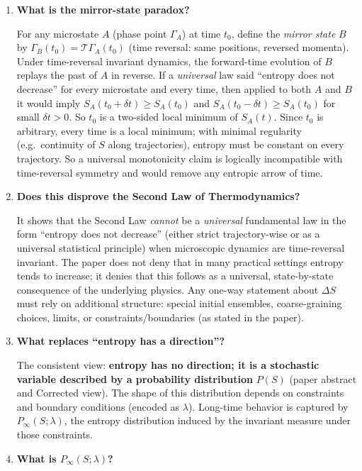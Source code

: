\documentclass[11pt,a4paper]{article}
\begin{document}
\begin{enumerate}[leftmargin=*]

\item \textbf{What is the mirror-state paradox?}

For any microstate $A$ (phase point $\Gamma_A$) at time $t_0$, define the \emph{mirror state} $B$ by $\Gamma_B(t_0)=\mathcal{T}\Gamma_A(t_0)$ (time reversal: same positions, reversed momenta). Under time-reversal invariant dynamics, the forward-time evolution of $B$ replays the past of $A$ in reverse. If a \emph{universal} law said ``entropy does not decrease'' for every microstate and every time, then applied to both $A$ and $B$ it would imply $S_A(t_0+\delta t) \ge S_A(t_0)$ and $S_A(t_0-\delta t) \ge S_A(t_0)$ for small $\delta t > 0$. So $t_0$ is a two-sided local minimum of $S_A(t)$. Since $t_0$ is arbitrary, every time is a local minimum; with minimal regularity (e.g.\ continuity of $S$ along trajectories), entropy must be constant on every trajectory. So a universal monotonicity claim is logically incompatible with time-reversal symmetry and would remove any entropic arrow of time.

\item \textbf{Does this disprove the Second Law of Thermodynamics?}

It shows that the Second Law \emph{cannot} be a \emph{universal} fundamental law in the form ``entropy does not decrease'' (either strict trajectory-wise or as a universal statistical principle) when microscopic dynamics are time-reversal invariant. The paper does not deny that in many practical settings entropy tends to increase; it denies that this follows as a universal, state-by-state consequence of the underlying physics. Any one-way statement about $\Delta S$ must rely on additional structure: special initial ensembles, coarse-graining choices, limits, or constraints/boundaries (as stated in the paper).

\item \textbf{What replaces ``entropy has a direction''?}

The consistent view: \textbf{entropy has no direction; it is a stochastic variable described by a probability distribution} $P(S)$ (paper abstract and Corrected view). The shape of this distribution depends on constraints and boundary conditions (encoded as $\lambda$). Long-time behavior is captured by $P_{\infty}(S;\lambda)$, the entropy distribution induced by the invariant measure under those constraints.

\item \textbf{What is $P_{\infty}(S;\lambda)$?}


\end{enumerate}
\end{document}
